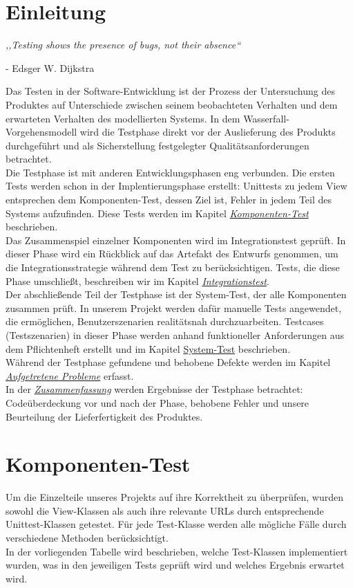 \documentclass[parskip=full,11pt]{scrartcl}
\begin{document}
 \section{Einleitung}
\begin{center}
\textit{,,Testing shows the presence of bugs, not their absence``}
\end{center}
\begin{flushright}
- Edsger W. Dijkstra\\
\end{flushright}
Das Testen in der Software-Entwicklung ist der Prozess der Untersuchung des Produktes auf Unterschiede zwischen seinem beobachteten Verhalten und dem erwarteten Verhalten des modellierten Systems.
In dem Wasserfall-Vorgehensmodell wird die Testphase direkt vor der Auslieferung des Produkts durchgeführt und als Sicherstellung festgelegter Qualitätsanforderungen betrachtet.\\
Die Testphase ist mit anderen Entwicklungsphasen eng verbunden. Die ersten Tests werden schon in der Implentierungsphase erstellt: Unittests zu jedem View entsprechen dem Komponenten-Test, dessen Ziel ist, Fehler in jedem Teil des Systems aufzufinden. Diese Tests werden im Kapitel \hyperref[komponententest]{\textit{Komponenten-Test}} beschrieben.\\
Das Zusammenspiel einzelner Komponenten wird im Integrationstest geprüft. In dieser Phase wird ein Rückblick auf das Artefakt des Entwurfs genommen, um die Integrationsstrategie während dem Test zu berücksichtigen. Tests, die diese Phase umschlie{\ss}t, beschreiben wir im Kapitel \hyperref[integrationtest]{\textit{Integrationstest}}.\\
Der abschlie{\ss}ende Teil der Testphase ist der System-Test, der alle Komponenten zusammen prüft. In unserem Projekt werden dafür manuelle Tests angewendet, die ermöglichen, Benutzerszenarien realitätsnah durchzuarbeiten. Testcases (Testszenarien) in dieser Phase werden anhand funktioneller Anforderungen aus dem Pflichtenheft erstellt und im Kapitel \hyperref[System-Test]{System-Test} beschrieben.\\
Während der Testphase gefundene und behobene  Defekte werden im Kapitel \hyperref[bugs]{\textit{Aufgetretene Probleme}} erfasst.\\
In der \hyperref[zusammenfassung]{\textit{Zusammenfassung}} werden Ergebnisse der Testphase betrachtet: Codeüberdeckung vor und nach der Phase, behobene Fehler und unsere Beurteilung der Lieferfertigkeit des Produktes.
 \newpage
\section{Komponenten-Test} \label{komponententest}
Um die Einzelteile unseres Projekts auf ihre Korrektheit zu überprüfen, wurden sowohl die View-Klassen als auch ihre relevante URLs durch entsprechende Unittest-Klassen getestet. Für jede Test-Klasse werden alle mögliche Fälle durch verschiedene Methoden berücksichtigt.\\
In der vorliegenden Tabelle wird beschrieben, welche Test-Klassen implementiert wurden, was in den jeweiligen Tests geprüft wird und welches Ergebnis erwartet wird.
\end{document}
